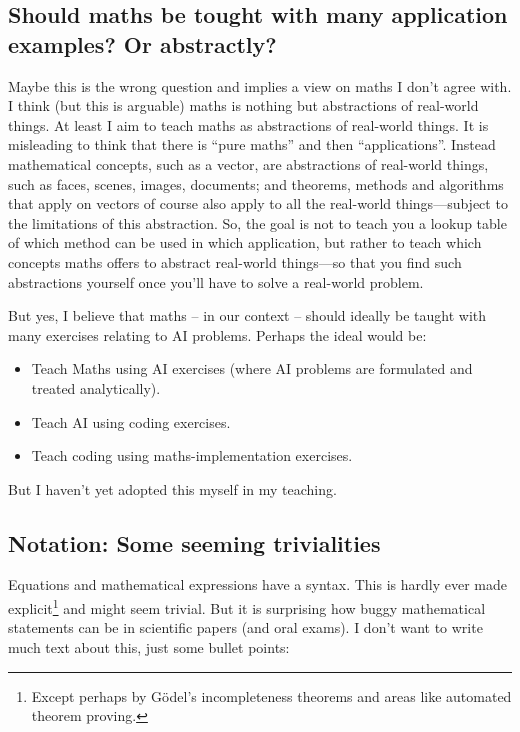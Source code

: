 \subsection{Should maths be tought with many application examples? Or
abstractly?}

Maybe this is the wrong question and implies a view on maths I don't
agree with. I think (but this is arguable) maths is nothing but
abstractions of real-world things. At least I aim to teach maths as
abstractions of real-world things. It is misleading to think that
there is ``pure maths'' and then ``applications''. Instead
mathematical concepts, such as a vector, are abstractions of
real-world things, such as faces, scenes, images, documents; and
theorems, methods and algorithms that apply on vectors of course also
apply to all the real-world things---subject to the limitations of
this abstraction. So, the goal is not to teach you a lookup table of
which method can be used in which application, but rather to teach
which concepts maths offers to abstract real-world things---so that
you find such abstractions yourself once you'll have to solve a
real-world problem.

But yes, I believe that maths -- in our context -- should ideally be taught with many exercises relating to AI problems. Perhaps the ideal would be:
\begin{itemize}
\item Teach Maths using AI exercises (where AI problems are formulated and treated analytically).
\item Teach AI using coding exercises.
\item Teach coding using maths-implementation exercises.
\end{itemize}
But I haven't yet adopted this myself in my teaching.


\subsection{Notation: Some seeming trivialities}

Equations and mathematical expressions have a syntax. This is hardly
ever made explicit\footnote{Except perhaps by G{\"o}del's incompleteness
theorems and areas like automated theorem proving.} and might seem
trivial. But it is surprising how buggy mathematical statements can be
in scientific papers (and oral exams). I don't want to write much text
about this, just some bullet points:

